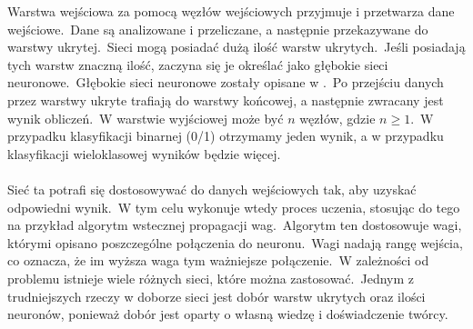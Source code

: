Warstwa wejściowa za pomocą węzłów wejściowych przyjmuje i przetwarza dane wejściowe.\ Dane są analizowane i przeliczane, a następnie przekazywane do warstwy ukrytej.\ Sieci mogą posiadać dużą ilość warstw ukrytych.\ Jeśli posiadają tych warstw znaczną ilość, zaczyna się je określać jako głębokie sieci neuronowe.\ Głębokie sieci neuronowe zostały opisane w .\ Po przejściu danych przez warstwy ukryte trafiają do warstwy końcowej, a następnie zwracany jest wynik obliczeń.\ W warstwie wyjściowej może być $n$ węzłów, gdzie $n \geq 1$.\ W przypadku klasyfikacji binarnej (0/1) otrzymamy jeden wynik, a w przypadku klasyfikacji wieloklasowej wyników będzie więcej.
\\ \\
Sieć ta potrafi się dostosowywać do danych wejściowych tak, aby uzyskać odpowiedni wynik.\ W tym celu wykonuje wtedy proces uczenia, stosując do tego na przykład algorytm wstecznej propagacji wag.\ Algorytm ten dostosowuje wagi, którymi opisano poszczególne połączenia do neuronu.\ Wagi nadają rangę wejścia, co oznacza, że im wyższa waga tym ważniejsze połączenie.\ W zależności od problemu istnieje wiele różnych sieci, które można zastosować.\ Jednym z trudniejszych rzeczy w doborze sieci jest dobór warstw ukrytych oraz ilości neuronów, ponieważ dobór jest oparty o własną wiedzę i doświadczenie twórcy.

